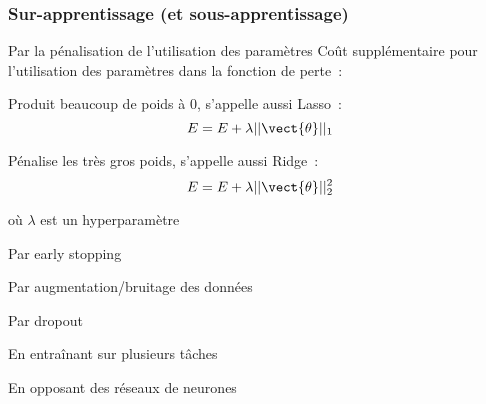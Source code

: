 \begin{frame}
  \frametitle{Sur-apprentissage (et sous-apprentissage)}
\end{frame}

\begin{frame}{Par la pénalisation de l'utilisation des paramètres}
  Coût supplémentaire pour l'utilisation des paramètres dans la fonction de perte~:
  \begin{description}[<+->]
    \item[L1] Produit beaucoup de poids à 0, s'appelle aussi Lasso~:
      \[
        E = E + \lambda ||\vect{\theta}||_1
      \]
    \item[L2] Pénalise les très gros poids, s'appelle aussi Ridge~:
      \[
        E = E + \lambda ||\vect{\theta}||_2^2
      \]
  \end{description}

  où $\lambda$ est un hyperparamètre
\end{frame}

\begin{frame}{Par early stopping}
\end{frame}

\begin{frame}{Par augmentation/bruitage des données}
\end{frame}

\begin{frame}{Par dropout}
\end{frame}

\begin{frame}{En entraînant sur plusieurs tâches}
\end{frame}

\begin{frame}{En opposant des réseaux de neurones}
\end{frame}
